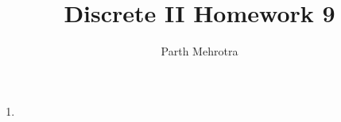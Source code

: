 \documentclass{article}
\begin{document}
	\title{Discrete II Homework 9}
	\author{Parth Mehrotra}
	\maketitle

	\begin{enumerate}
		\item
			

	\end{enumerate}
\end{document}
